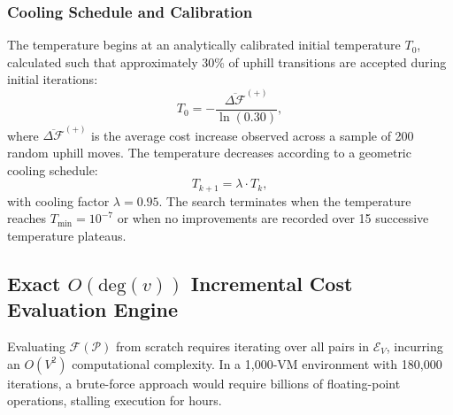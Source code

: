 \documentclass[conference]{IEEEtran}
\begin{document}
\subsubsection{Cooling Schedule and Calibration}
The temperature begins at an analytically calibrated initial temperature $T_0$, calculated such that approximately 30\% of uphill transitions are accepted during initial iterations:
\begin{equation}
T_0 = -\frac{\overline{\Delta \mathcal{F}}^{(+)}}{\ln(0.30)},
\end{equation}
where $\overline{\Delta \mathcal{F}}^{(+)}$ is the average cost increase observed across a sample of 200 random uphill moves. The temperature decreases according to a geometric cooling schedule:
\begin{equation}
T_{k+1} = \lambda \cdot T_k,
\end{equation}
with cooling factor $\lambda = 0.95$. The search terminates when the temperature reaches $T_{\min} = 10^{-7}$ or when no improvements are recorded over 15 successive temperature plateaus.

\subsection{Exact $O(\mathrm{deg}(v))$ Incremental Cost Evaluation Engine}
Evaluating $\mathcal{F}(\mathcal{P})$ from scratch requires iterating over all pairs in $\mathcal{E}_V$, incurring an $O(V^2)$ computational complexity. In a 1,000-VM environment with 180,000 iterations, a brute-force approach would require billions of floating-point operations, stalling execution for hours.
\end{document}
